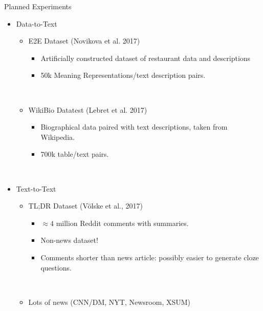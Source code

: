 \begin{frame}{Planned Experiments}
    \begin{itemize}
        \item Data-to-Text
            \begin{itemize}
                \item<1-> E2E Dataset (Novikova et al. 2017)
                    \begin{itemize}
                        \item Artificially constructed dataset of restaurant data and descriptions
                        \item 50k Meaning Representations/text description pairs.
                    \end{itemize}~\\
                \item<2-> WikiBio Datatest (Lebret et al. 2017)
                    \begin{itemize}
                        \item Biographical data paired with text descriptions,
                            taken from Wikipedia.
                    \item 700k table/text pairs.
            \end{itemize}
            \end{itemize}
            ~\\
        \item<3-> Text-to-Text
            \begin{itemize}
                \item<4-> TL;DR Dataset (V\"olske et al., 2017)
                    \begin{itemize}
                        \item $\approx 4$ million Reddit comments with 
                    summaries. 
                    \item Non-news dataset!
                    \item Comments shorter than news article: possibly easier to generate cloze questions.
            \end{itemize}~\\
                \item<5> Lots of news (CNN/DM, NYT, Newsroom, XSUM)
            \end{itemize}
 \end{itemize}
         \end{frame}

